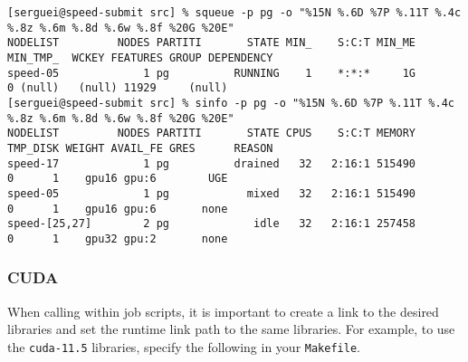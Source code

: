 
\scriptsize
\begin{verbatim}
[serguei@speed-submit src] % squeue -p pg -o "%15N %.6D %7P %.11T %.4c %.8z %.6m %.8d %.6w %.8f %20G %20E"
NODELIST         NODES PARTITI       STATE MIN_    S:C:T MIN_ME MIN_TMP_  WCKEY FEATURES GROUP DEPENDENCY
speed-05             1 pg          RUNNING    1    *:*:*     1G        0 (null)   (null) 11929     (null)
[serguei@speed-submit src] % sinfo -p pg -o "%15N %.6D %7P %.11T %.4c %.8z %.6m %.8d %.6w %.8f %20G %20E"
NODELIST         NODES PARTITI       STATE CPUS    S:C:T MEMORY TMP_DISK WEIGHT AVAIL_FE GRES      REASON
speed-17             1 pg          drained   32   2:16:1 515490        0      1    gpu16 gpu:6        UGE
speed-05             1 pg            mixed   32   2:16:1 515490        0      1    gpu16 gpu:6       none
speed-[25,27]        2 pg             idle   32   2:16:1 257458        0      1    gpu32 gpu:2       none
\end{verbatim}
\normalsize


\subsubsection{CUDA}

When calling  within job scripts, it is important to create a link to
the desired  libraries and set the runtime link path to the same libraries. 
For example, to use the \texttt{cuda-11.5} libraries, specify the following in 
your \texttt{Makefile}.


